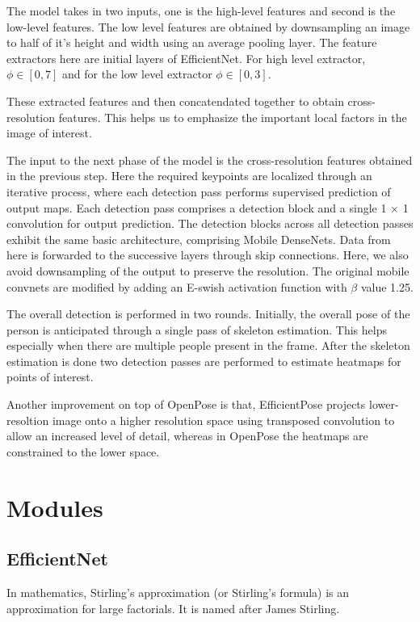\documentclass{fisatprojectfinal}
\begin{document}
The model takes in two inputs, one is the high-level features and second is the low-level features.
The low level features are obtained by downsampling an image to half of it's height and width using an average pooling layer.
The feature extractors here are initial layers of EfficientNet. For high level extractor, $\phi \in [0,7]$ and 
for the low level extractor $\phi \in [0,3]$.
\par
These extracted features and then concatendated together to obtain cross-resolution features.
This helps us to emphasize the important local factors in the image of interest.
\par
The input to the next phase of the model is the cross-resolution features obtained in the previous step.
Here the required keypoints are localized through an iterative process, where each
detection pass performs supervised prediction of output maps.
Each detection pass comprises a detection block
and a single 1 × 1 convolution for output prediction.
The detection blocks across all detection passes exhibit the
same basic architecture, comprising Mobile DenseNets.
Data from here is forwarded to the successive layers through skip connections.
Here, we also avoid downsampling of the output to preserve the resolution.
The original mobile convnets are modified by adding an E-swish activation function with $\beta$ value 1.25.
\par
The overall detection is performed in two rounds. Initially, the overall pose of the person is anticipated through a single pass of skeleton estimation. This helps especially when
there are multiple people present in the frame.
After the skeleton estimation is done two detection passes are performed to estimate heatmaps for points of interest.

\par
Another improvement on top of OpenPose is that, EfficientPose projects lower-resoltion image onto a higher resolution space using transposed convolution to allow an increased level of detail, whereas in OpenPose the heatmaps are
constrained to the lower space.
\section{Modules}
\subsection{EfficientNet}
In mathematics, Stirling's approximation (or Stirling's formula) is an approximation for large factorials. It is named after James Stirling.
\end{document}
